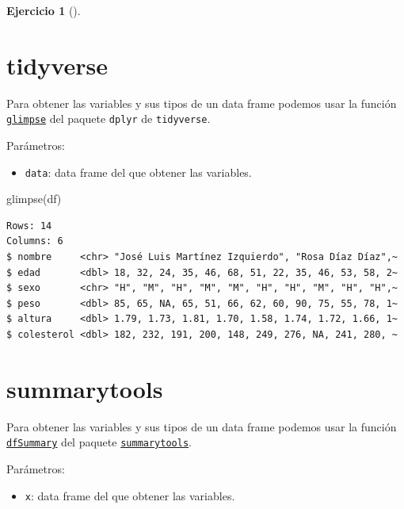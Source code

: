 \documentclass[
  spanish,
  a4paper,
]{scrreport}
\newenvironment{Shaded}{\begin{snugshade}}{\end{snugshade}}
\newcommand{\FunctionTok}[1]{\textcolor[rgb]{0.28,0.35,0.67}{#1}}
\newcommand{\NormalTok}[1]{\textcolor[rgb]{0.00,0.23,0.31}{#1}}
\providecommand{\tightlist}{%
  \setlength{\itemsep}{0pt}\setlength{\parskip}{0pt}}
\theoremstyle{definition}
\newtheorem{exercise}{Ejercicio}[chapter]
\theoremstyle{remark}
\begin{document}
\begin{exercise}[]
\begin{enumerate}
\begin{tcolorbox}
  \section{tidyverse}

  Para obtener las variables y sus tipos de un data frame podemos usar
  la función
  \href{https://dplyr.tidyverse.org/reference/glimpse.html}{\texttt{glimpse}}
  del paquete \texttt{dplyr} de \texttt{tidyverse}.

  Parámetros:

  \begin{itemize}
  \tightlist
  \item
    \texttt{data}: data frame del que obtener las variables.
  \end{itemize}

\begin{Shaded}
\begin{Highlighting}[]
\FunctionTok{glimpse}\NormalTok{(df)}
\end{Highlighting}
\end{Shaded}

\begin{verbatim}
Rows: 14
Columns: 6
$ nombre     <chr> "José Luis Martínez Izquierdo", "Rosa Díaz Díaz",~
$ edad       <dbl> 18, 32, 24, 35, 46, 68, 51, 22, 35, 46, 53, 58, 2~
$ sexo       <chr> "H", "M", "H", "M", "M", "H", "H", "M", "H", "H",~
$ peso       <dbl> 85, 65, NA, 65, 51, 66, 62, 60, 90, 75, 55, 78, 1~
$ altura     <dbl> 1.79, 1.73, 1.81, 1.70, 1.58, 1.74, 1.72, 1.66, 1~
$ colesterol <dbl> 182, 232, 191, 200, 148, 249, 276, NA, 241, 280, ~
\end{verbatim}

  \section{summarytools}

  Para obtener las variables y sus tipos de un data frame podemos usar
  la función
  \href{https://www.rdocumentation.org/packages/summarytools/versions/1.1.4/topics/dfSummary}{\texttt{dfSummary}}
  del paquete
  \href{https://www.rdocumentation.org/packages/summarytools}{\texttt{summarytools}}.

  Parámetros:

  \begin{itemize}
  \tightlist
  \item
    \texttt{x}: data frame del que obtener las variables.
  \end{itemize}


\end{tcolorbox}
\end{enumerate}
\end{exercise}
\end{document}
